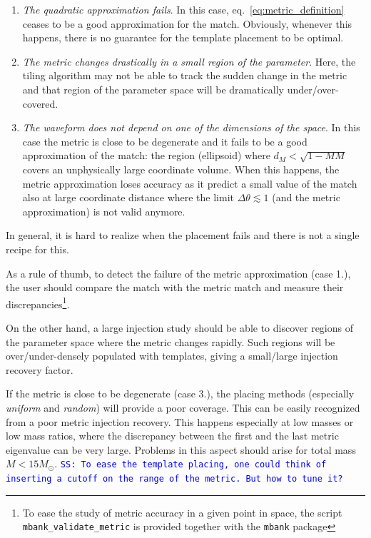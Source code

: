 \documentclass[twocolumn,showpacs,preprintnumbers,nofootinbib,prd,
superscriptaddress,10pt]{revtex4-1}
\newcommand{\stefano}[1]{{\textcolor{blue}{\texttt{SS: #1}} }}
\begin{document}
\begin{enumerate}
	\item {\it The quadratic approximation fails}. In this case, eq.~\eqref{eq:metric_definition} ceases to be a good approximation for the match. Obviously, whenever this happens, there is no guarantee for the template placement to be optimal.
	\item {\it The metric changes drastically in a small region of the parameter}. Here, the tiling algorithm may not be able to track the sudden change in the metric and that region of the parameter space will be dramatically under/over-covered.
	\item {\it The waveform does not depend on one of the dimensions of the space}. In this case the metric is close to be degenerate and it fails to be a good approximation of the match: the region (ellipsoid) where $d_M<\sqrt{1-MM}$ covers an unphysically large coordinate volume. When this happens, the metric approximation loses accuracy as it predict a small value of the match also at large coordinate distance where the limit $\Delta\theta \lesssim 1$ (and the metric approximation) is not valid anymore.
\end{enumerate}

In general, it is hard to realize when the placement fails and there is not a single recipe for this.

As a rule of thumb, to detect the failure of the metric approximation (case 1.), the user should compare the match with the metric match and measure their discrepancies\footnote{To ease the study of metric accuracy in a given point in space, the script \texttt{mbank\_validate\_metric} is provided together with the \texttt{mbank} package}.

On the other hand, a large injection study should be able to discover regions of the parameter space where the metric changes rapidly. Such regions will be over/under-densely populated with templates, giving a small/large injection recovery factor.

If the metric is close to be degenerate (case 3.), the placing methods (especially {\it uniform} and {\it random}) will provide a poor coverage. This can be easily recognized from a poor metric injection recovery. This happens especially at low masses or low mass ratios, where the discrepancy between the first and the last metric eigenvalue can be very large. Problems in this aspect should arise for total mass $M<15 M_{\odot}$.
\stefano{To ease the template placing, one could think of inserting a cutoff on the range of the metric. But how to tune it?}
\end{document}
